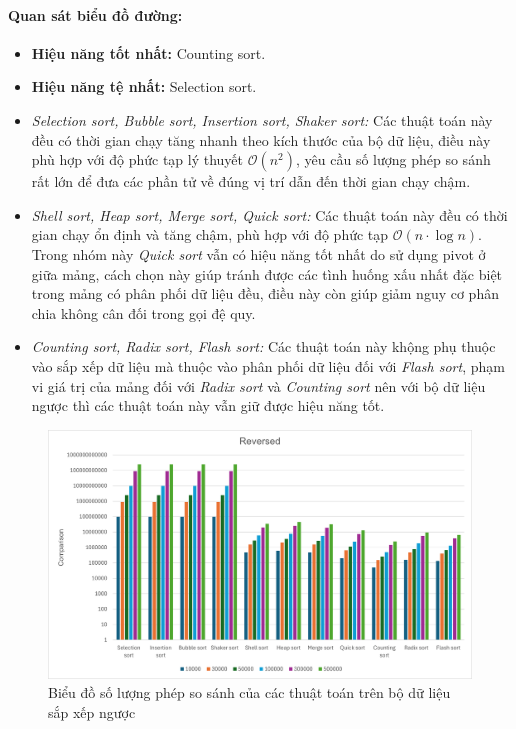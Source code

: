     \paragraph{Quan sát biểu đồ đường:}
    \begin{itemize}
        \item \textbf{Hiệu năng tốt nhất:} Counting sort.
        \item \textbf{Hiệu năng tệ nhất:} Selection sort. 
        \item \textit{Selection sort, Bubble sort, Insertion sort, Shaker sort:} Các thuật toán này đều có thời gian chạy tăng nhanh theo kích thước của bộ dữ liệu, điều này phù hợp với độ phức tạp lý thuyết $\mathcal{O}(n^2)$, yêu cầu số lượng phép so sánh rất lớn để đưa các phần tử về đúng vị trí dẫn đến thời gian chạy chậm.
        \item \textit{Shell sort, Heap sort, Merge sort, Quick sort:} Các thuật toán này đều có thời gian chạy ổn định và tăng chậm, phù hợp với độ phức tạp $\mathcal{O}(n \cdot \log n)$. Trong nhóm này \textit{Quick sort} vẫn có hiệu năng tốt nhất do sử dụng pivot ở giữa mảng, cách chọn này giúp tránh được các tình huống xấu nhất đặc biệt trong mảng có phân phối dữ liệu đều, điều này còn giúp giảm nguy cơ phân chia không cân đối trong gọi đệ quy.
        \item \textit{Counting sort, Radix sort, Flash sort:} Các thuật toán này khộng phụ thuộc vào sắp xếp dữ liệu mà thuộc vào phân phối dữ liệu đối với \textit{Flash sort}, phạm vi giá trị của mảng đối với \textit{Radix sort} và \textit{Counting sort} nên với bộ dữ liệu ngược thì các thuật toán này vẫn giữ được hiệu năng tốt.
    \end{itemize}

    \newpage

    \begin{figure}[H]
        \centering
        \includegraphics[width = 0.9\linewidth]{img/experiment/comparison/reversed.png}
        \caption{Biểu đồ số lượng phép so sánh của các thuật toán trên bộ dữ liệu sắp xếp ngược}
    \end{figure}

